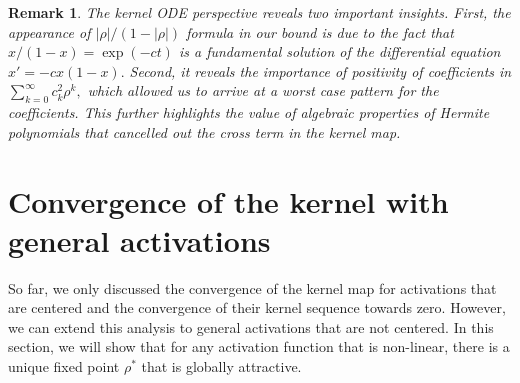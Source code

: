 \documentclass[twoside]{article}
\newcommand{\E}{\mathbb{E}}
\newcommand{\he}{\mathrm{he}}
\newtheorem{remark}{Remark}
\theoremstyle{definition}
\newcommand{\thomas}[1]{{\color{blue}TH:  \textit{#1}}}
\begin{document}
\begin{remark}
   The kernel ODE perspective reveals two important insights. 
   First, the appearance of $|\rho|/(1-|\rho|)$ formula in our bound is due to the fact that $x/(1-x) = \exp( -c t) $ is a fundamental solution of the differential equation $x' = - c x(1-x).$ Second, it reveals the importance of positivity of coefficients in $\sum_{k=0}^\infty c_k^2\rho^k,$ which allowed us to arrive at a worst case pattern for the coefficients. This further highlights the value of algebraic properties of Hermite polynomials that cancelled out the cross term in the kernel map. 
\end{remark}


% 





\section{Convergence of the kernel with general activations}
So far, we only discussed the convergence of the kernel map for activations that are centered and the convergence of their kernel sequence towards zero. However, we can extend this analysis to general activations that are not centered. In this section, we will show that for any activation function that is non-linear, there is a unique fixed point $\rho^*$ that is globally attractive.
\end{document}
